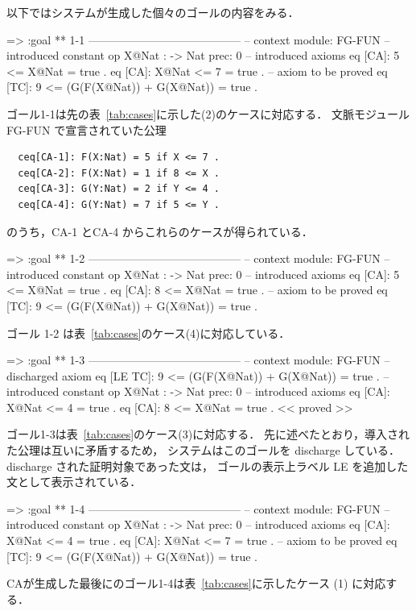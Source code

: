 \documentclass[a4paper,oneside,10pt,here]{memoir}
\newenvironment{vvtm}%
{\parskip=0pt\lineskip=0pt\begin{center}\begin{minipage}{0.8\textwidth}\begin{snugshade}}%
  {\end{snugshade}\end{minipage}\end{center}}
\begin{document}
以下ではシステムが生成した個々のゴールの内容をみる．

\begin{vvtm}
\begin{simplev}
[ca]=>
:goal { ** 1-1 -----------------------------------------
  -- context module: FG-FUN
  -- introduced constant
    op X@Nat : -> Nat { prec: 0 }
  -- introduced axioms
    eq [CA]: 5 <= X@Nat = true .
    eq [CA]: X@Nat <= 7 = true .
  -- axiom to be proved
    eq [TC]: 9 <= (G(F(X@Nat)) + G(X@Nat))
        = true .
}
\end{simplev}
\end{vvtm}
ゴール1-1は先の表~\ref{tab:cases}に示した(2)のケースに対応する．
文脈モジュール FG-FUN で宣言されていた公理
\begin{verbatim}
  ceq[CA-1]: F(X:Nat) = 5 if X <= 7 .
  ceq[CA-2]: F(X:Nat) = 1 if 8 <= X .
  ceq[CA-3]: G(Y:Nat) = 2 if Y <= 4 .
  ceq[CA-4]: G(Y:Nat) = 7 if 5 <= Y .
\end{verbatim}
のうち，CA-1 とCA-4 からこれらのケースが得られている．

\begin{vvtm}
\begin{simplev}
[ca]=>
:goal { ** 1-2 -----------------------------------------
  -- context module: FG-FUN
  -- introduced constant
    op X@Nat : -> Nat { prec: 0 }
  -- introduced axioms
    eq [CA]: 5 <= X@Nat = true .
    eq [CA]: 8 <= X@Nat = true .
  -- axiom to be proved
    eq [TC]: 9 <= (G(F(X@Nat)) + G(X@Nat))
        = true .
}
\end{simplev}
\end{vvtm}
ゴール 1-2 は表~\ref{tab:cases}のケース(4)に対応している．

\begin{vvtm}
\begin{simplev}
[ca]=>
:goal { ** 1-3 -----------------------------------------
  -- context module: FG-FUN
  -- discharged axiom
    eq [LE TC]: 9 <= (G(F(X@Nat)) + G(X@Nat))
        = true .
  -- introduced constant
    op X@Nat : -> Nat { prec: 0 }
  -- introduced axioms
    eq [CA]: X@Nat <= 4 = true .
    eq [CA]: 8 <= X@Nat = true .
} << proved >>
\end{simplev}
\end{vvtm}
ゴール1-3は表~\ref{tab:cases}のケース(3)に対応する．
先に述べたとおり，導入された公理は互いに矛盾するため，
システムはこのゴールを discharge している．
discharge された証明対象であった文は，
ゴールの表示上ラベル LE を追加した文として表示されている．

\begin{vvtm}
  \begin{simplev}
[ca]=>
:goal { ** 1-4 -----------------------------------------
  -- context module: FG-FUN
  -- introduced constant
    op X@Nat : -> Nat { prec: 0 }
  -- introduced axioms
    eq [CA]: X@Nat <= 4 = true .
    eq [CA]: X@Nat <= 7 = true .
  -- axiom to be proved
    eq [TC]: 9 <= (G(F(X@Nat)) + G(X@Nat))
        = true .
}
\end{simplev}
\end{vvtm}
CAが生成した最後にのゴール1-4は表~\ref{tab:cases}に示したケース
(1) に対応する．
\end{document}
